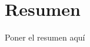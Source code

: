 \begingroup
\let\clearpage\relax
\let\cleardoublepage\relax
\let\cleardoublepage\relax

\chapter*{Resumen}

Poner el resumen aquí

\vfill



\endgroup

\vfill
